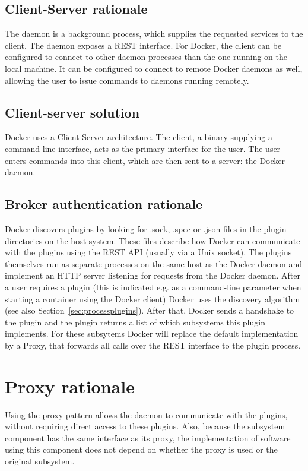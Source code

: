 \subsection{Client-Server rationale}
The daemon is a background process, which supplies the requested services to the client. The daemon exposes a REST interface.
For Docker, the client can be configured to connect to other daemon processes than the one running on the local machine. It can be configured to connect to remote Docker daemons as well, allowing the user to issue commands to daemons running remotely.

\subsection{Client-server solution}
Docker uses a {Client-Server} architecture. The client, a binary supplying a command-line interface, acts as the primary interface for the user. The user enters commands into this client, which are then sent to a server: the Docker daemon.

\subsection{Broker authentication rationale}
Docker discovers plugins by looking for .sock, .spec or .json files in the plugin directories on the host system. These files describe how Docker can communicate with the plugins using the REST API (usually via a Unix socket).
The plugins themselves run as separate processes on the same host as the Docker daemon and implement an HTTP server listening for requests from the Docker daemon. After a user requires a plugin (this is indicated e.g. as a command-line parameter when starting a container using the Docker client) Docker uses the discovery algorithm (see also Section~\ref{sec:processplugins}). After that, Docker sends a handshake to the plugin and the plugin returns a list of which subsystems this plugin implements.
For these subsytems Docker will replace the default implementation by a Proxy, that forwards all calls over the REST interface to the plugin process.

\section{Proxy rationale}
Using the {proxy} pattern allows the daemon to communicate with the plugins, without requiring direct access to these plugins.
Also, because the subsystem component has the same interface as its proxy, the implementation of software using this component does not depend on whether the proxy is used or the original subsystem.







